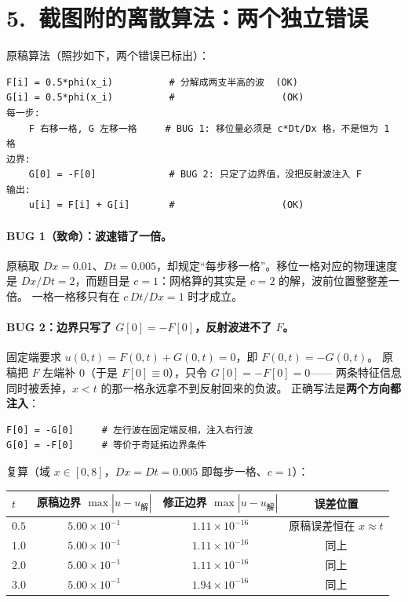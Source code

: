 \documentclass[11pt,a4paper]{ctexart}
\begin{document}
\section*{5.\ 截图附的离散算法：两个独立错误}

\noindent 原稿算法（照抄如下，两个错误已标出）：
\begin{verbatim}
F[i] = 0.5*phi(x_i)          # 分解成两支半高的波  (OK)
G[i] = 0.5*phi(x_i)          #                   (OK)
每一步:
    F 右移一格, G 左移一格     # BUG 1: 移位量必须是 c*Dt/Dx 格，不是恒为 1 格
边界:
    G[0] = -F[0]             # BUG 2: 只定了边界值，没把反射波注入 F
输出:
    u[i] = F[i] + G[i]       #                   (OK)
\end{verbatim}

\paragraph{BUG 1（致命）：波速错了一倍。}
原稿取 $Dx=0.01$、$Dt=0.005$，却规定“每步移一格”。移位一格对应的物理速度是
$Dx/Dt=2$，而题目是 $c=1$：网格算的其实是 $c=2$ 的解，波前位置整整差一倍。
一格一格移只有在 $c\,Dt/Dx=1$ 时才成立。

\paragraph{BUG 2：边界只写了 $G[0]=-F[0]$，反射波进不了 $F$。}
固定端要求 $u(0,t)=F(0,t)+G(0,t)=0$，即 $F(0,t)=-G(0,t)$。
原稿把 $F$ 左端补 $0$（于是 $F[0]\equiv 0$），只令 $G[0]=-F[0]=0$——
两条特征信息同时被丢掉，$x<t$ 的那一格永远拿不到反射回来的负波。
正确写法是\textbf{两个方向都注入}：
\begin{verbatim}
F[0] = -G[0]     # 左行波在固定端反相，注入右行波
G[0] = -F[0]     # 等价于奇延拓边界条件
\end{verbatim}

\noindent 复算（域 $x\in[0,8]$，$Dx=Dt=0.005$ 即每步一格、$c=1$）：
\begin{center}
\begin{tabular}{lccc}
\toprule
$t$ & 原稿边界 $\max|u-u_{\text{解}}|$ & 修正边界 $\max|u-u_{\text{解}}|$ & 误差位置 \\
\midrule
$0.5$ & $5.00\times10^{-1}$ & $1.11\times10^{-16}$ & 原稿误差恒在 $x\approx t$ \\
$1.0$ & $5.00\times10^{-1}$ & $1.11\times10^{-16}$ & 同上 \\
$2.0$ & $5.00\times10^{-1}$ & $1.11\times10^{-16}$ & 同上 \\
$3.0$ & $5.00\times10^{-1}$ & $1.94\times10^{-16}$ & 同上 \\
\bottomrule
\end{tabular}
\end{center}
\end{document}
